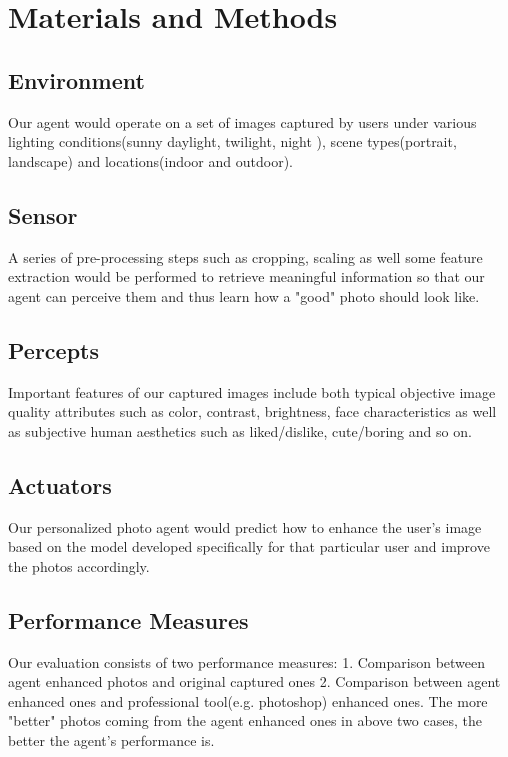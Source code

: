 \documentclass[11pt, a4paper, twocolumn]{article}
\begin{document}
\section{Materials and Methods}

\subsection{Environment}
Our agent would operate on a set of images captured by users under various lighting conditions(sunny daylight, twilight, night ), scene types(portrait, landscape) and locations(indoor and outdoor). 
\subsection{Sensor} 
A series of pre-processing steps such as cropping, scaling as well some feature extraction would be performed to retrieve meaningful information so that our agent can perceive them and thus learn how a "good" photo should look like.\subsection{Percepts}
Important features of our captured images include both typical objective image quality attributes such as color, contrast, brightness, face characteristics as well as subjective human aesthetics such as liked/dislike, cute/boring and so on.  
\subsection{Actuators}
Our personalized photo agent would predict how to enhance the user’s image based on the model developed specifically for that particular user and improve the photos accordingly. 
\subsection{Performance Measures}
Our evaluation consists of two performance measures: 1. Comparison between  agent enhanced photos and original  captured ones  2. Comparison between agent enhanced ones and professional tool(e.g. photoshop) enhanced ones.  The more "better" photos coming from the agent enhanced ones in above two cases, the better the agent's performance is.
\end{document}
